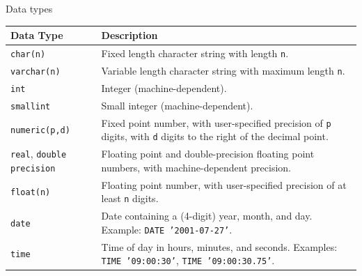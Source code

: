 \begin{knBox}
    {Data types}
    \begin{tabular}{|l|p{10cm}|}
        \hline
        \textbf{Data Type}                       & \textbf{Description}                                                                                                                                                          \\ \hline
        \texttt{char(n)}                         & Fixed length character string with length \texttt{n}.                                                                                                                         \\
        \texttt{varchar(n)}                      & Variable length character string with maximum length \texttt{n}.                                                                                                              \\
        \texttt{int}                             & Integer (machine-dependent).                                                                                                                                                  \\
        \texttt{smallint}                        & Small integer (machine-dependent).                                                                                                                                            \\
        \texttt{numeric(p,d)}                    & Fixed point number, with user-specified precision of \texttt{p} digits, with \texttt{d} digits to the right of the decimal point.                                             \\
        \texttt{real}, \texttt{double precision} & Floating point and double-precision floating point numbers, with machine-dependent precision.                                                                                 \\
        \texttt{float(n)}                        & Floating point number, with user-specified precision of at least \texttt{n} digits.                                                                                           \\
        \texttt{date}                            & Date containing a (4-digit) year, month, and day. Example: \texttt{DATE '2001-07-27'}.                                                                                        \\
        \texttt{time}                            & Time of day in hours, minutes, and seconds. Examples: \texttt{TIME '09:00:30'}, \texttt{TIME '09:00:30.75'}.                                                                  \\

\end{tabular}
\end{knBox}
